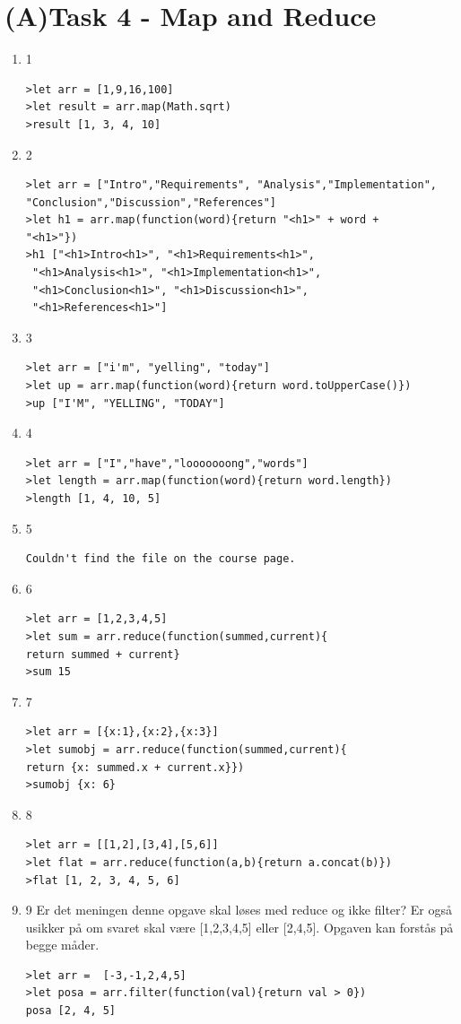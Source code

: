 \documentclass[a4paper,12pt]{article}
\begin{document}
\section{(A)Task 4 - Map and Reduce}
\begin{enumerate}
\item 1
\begin{lstlisting}
>let arr = [1,9,16,100]
>let result = arr.map(Math.sqrt)
>result [1, 3, 4, 10]
\end{lstlisting}
\item 2
\begin{lstlisting}
>let arr = ["Intro","Requirements", "Analysis","Implementation",
"Conclusion","Discussion","References"]
>let h1 = arr.map(function(word){return "<h1>" + word + 
"<h1>"})
>h1 ["<h1>Intro<h1>", "<h1>Requirements<h1>",
 "<h1>Analysis<h1>", "<h1>Implementation<h1>",
 "<h1>Conclusion<h1>", "<h1>Discussion<h1>",
 "<h1>References<h1>"]
\end{lstlisting}
\item 3
\begin{lstlisting}
>let arr = ["i'm", "yelling", "today"]
>let up = arr.map(function(word){return word.toUpperCase()})
>up ["I'M", "YELLING", "TODAY"]
\end{lstlisting}
\item 4
\begin{lstlisting}
>let arr = ["I","have","looooooong","words"]
>let length = arr.map(function(word){return word.length})
>length [1, 4, 10, 5]
\end{lstlisting}
\item 5
\begin{lstlisting}
Couldn't find the file on the course page.
\end{lstlisting}
\item 6
\begin{lstlisting}
>let arr = [1,2,3,4,5]
>let sum = arr.reduce(function(summed,current){
return summed + current}
>sum 15
\end{lstlisting}
\item 7
\begin{lstlisting}
>let arr = [{x:1},{x:2},{x:3}]
>let sumobj = arr.reduce(function(summed,current){
return {x: summed.x + current.x}})
>sumobj {x: 6}
\end{lstlisting}
\clearpage
\item 8
\begin{lstlisting}
>let arr = [[1,2],[3,4],[5,6]]
>let flat = arr.reduce(function(a,b){return a.concat(b)})
>flat [1, 2, 3, 4, 5, 6]
\end{lstlisting}
\item 9
Er det meningen denne opgave skal løses med reduce og ikke filter? 
Er også usikker på om svaret skal være [1,2,3,4,5] eller [2,4,5]. 
Opgaven kan forstås på begge måder.
\begin{lstlisting}
>let arr =  [-3,-1,2,4,5]
>let posa = arr.filter(function(val){return val > 0})
posa [2, 4, 5]
\end{lstlisting}

\end{enumerate}
\end{document}
